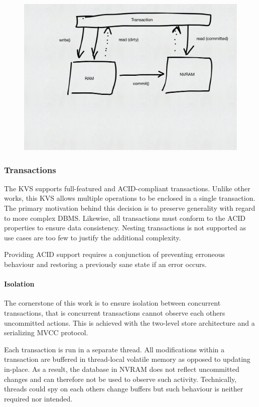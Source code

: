 \begin{figure}[!ht]
    \centering
    \includegraphics[width=\textwidth]{figures/drafts/concept-sys-two-level-store.pdf}
    \caption{}
    \label{fig:concept-two-level-store}
\end{figure}

\subsubsection{Transactions}

The KVS supports full-featured and ACID-compliant transactions. Unlike other
works, this KVS allows multiple operations to be enclosed in a single
transaction. The primary motivation behind this decision is to preserve
generality with regard to more complex DBMS. Likewise, all transactions must
conform to the ACID properties to ensure data consistency. Nesting transactions
is not supported as use cases are too few to justify the additional complexity.

Providing ACID support requires a conjunction of preventing erroneous behaviour
and restoring a previously sane state if an error occurs.

\paragraph{Isolation}

The cornerstone of this work is to ensure isolation between concurrent
transactions, that is concurrent transactions cannot observe each others
uncommitted actions. This is achieved with the two-level store architecture and
a serializing MVCC protocol.

Each transaction is run in a separate thread. All modifications within a
transaction are buffered in thread-local volatile memory as opposed to updating
in-place. As a result, the database in NVRAM does not reflect uncommitted
changes and can therefore not be used to observe such activity. Technically,
threads could spy on each others change buffers but such behaviour is neither
required nor intended.

